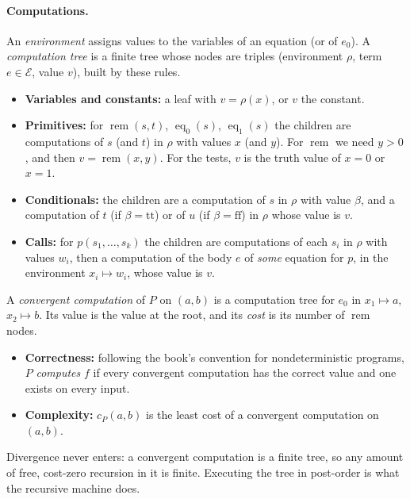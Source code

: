 \documentclass[11pt]{article}
\theoremstyle{remark}
\newcommand{\rem}{\operatorname{rem}}
\newcommand{\eq}{\operatorname{eq}}
\begin{document}
\paragraph{Computations.} An \emph{environment} assigns values to the
variables of an equation (or of $e_0$). A \emph{computation tree} is a finite
tree whose nodes are triples (environment $\rho$, term $e\in\mathcal E$, value
$v$), built by these rules.
\begin{itemize}
\item \textbf{Variables and constants:} a leaf with $v=\rho(x)$, or $v$ the constant.
\item \textbf{Primitives:} for $\rem(s,t)$, $\eq_0(s)$, $\eq_1(s)$ the children
are computations of $s$ (and $t$) in $\rho$ with values $x$ (and $y$). For
$\rem$ we need $y>0$, and then $v=\rem(x,y)$. For the tests, $v$ is the truth
value of $x=0$ or $x=1$.
\item \textbf{Conditionals:} the children are a computation of $s$ in $\rho$
with value $\beta$, and a computation of $t$ (if $\beta=\mathrm{tt}$) or of $u$
(if $\beta=\mathrm{ff}$) in $\rho$ whose value is $v$.
\item \textbf{Calls:} for $p(s_1,\ldots,s_k)$ the children are computations of
each $s_i$ in $\rho$ with values $w_i$, then a computation of the body $e$ of
\emph{some} equation for $p$, in the environment $x_i\mapsto w_i$, whose value
is $v$.
\end{itemize}
A \emph{convergent computation} of $P$ on $(a,b)$ is a computation tree for
$e_0$ in $x_1\mapsto a$, $x_2\mapsto b$. Its value is the value at the root,
and its \emph{cost} is its number of $\rem$ nodes.
\begin{itemize}
\item \textbf{Correctness:} following the book's convention for nondeterministic
  programs, $P$ \emph{computes} $f$ if every convergent computation has the
  correct value and one exists on every input.
\item \textbf{Complexity:} $c_P(a,b)$ is the least cost of a convergent computation on
  $(a,b)$.
\end{itemize}

Divergence never enters: a convergent computation is a finite tree, so any
amount of free, cost-zero recursion in it is finite. Executing the tree in
post-order is what the recursive machine does.
\end{document}
